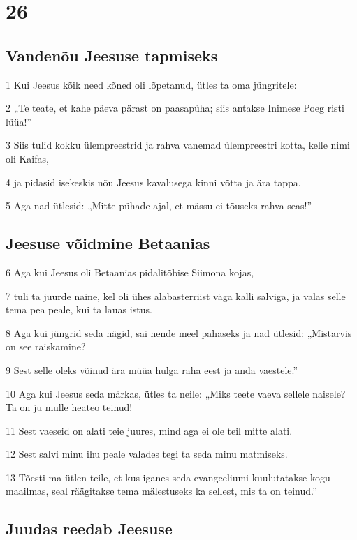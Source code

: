 \chapter{26}

\section*{Vandenõu Jeesuse tapmiseks}

\par 1 Kui Jeesus kõik need kõned oli lõpetanud, ütles ta oma jüngritele:
\par 2 „Te teate, et kahe päeva pärast on paasapüha; siis antakse Inimese Poeg risti lüüa!”
\par 3 Siis tulid kokku ülempreestrid ja rahva vanemad ülempreestri kotta, kelle nimi oli Kaifas,
\par 4 ja pidasid isekeskis nõu Jeesus kavalusega kinni võtta ja ära tappa.
\par 5 Aga nad ütlesid: „Mitte pühade ajal, et mässu ei tõuseks rahva seas!”

\section*{Jeesuse võidmine Betaanias}

\par 6 Aga kui Jeesus oli Betaanias pidalitõbise Siimona kojas,
\par 7 tuli ta juurde naine, kel oli ühes alabasterriist väga kalli salviga, ja valas selle tema pea peale, kui ta lauas istus.
\par 8 Aga kui jüngrid seda nägid, sai nende meel pahaseks ja nad ütlesid: „Mistarvis on see raiskamine?
\par 9 Sest selle oleks võinud ära müüa hulga raha eest ja anda vaestele.”
\par 10 Aga kui Jeesus seda märkas, ütles ta neile: „Miks teete vaeva sellele naisele? Ta on ju mulle heateo teinud!
\par 11 Sest vaeseid on alati teie juures, mind aga ei ole teil mitte alati.
\par 12 Sest salvi minu ihu peale valades tegi ta seda minu matmiseks.
\par 13 Tõesti ma ütlen teile, et kus iganes seda evangeeliumi kuulutatakse kogu maailmas, seal räägitakse tema mälestuseks ka sellest, mis ta on teinud.”

\section*{Juudas reedab Jeesuse}

